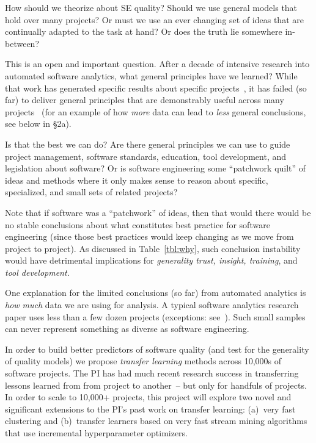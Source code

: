 


How should we theorize about SE quality?  Should we use  general models that hold over many projects? Or must we use an ever changing set of ideas that are   continually adapted to the task at hand? 
Or does the truth lie somewhere in-between?  

This is an open and important question. After a decade of intensive research into automated software analytics,
what general principles have we learned?
While that work has generated   specific results about   specific projects~\cite{Bird:2015,menzies2013software},
it has failed (so far) to deliver general principles that are demonstrably useful across many projects~\cite{menzies2013guest} (for an example of how {\em more} data can lead to {\em less} general conclusions,
see below in {\S}2a).

Is that the best we can do? 
Are there general principles we can use to guide project management, software standards, education,   tool development, and legislation about software? 
Or is  software engineering some ``patchwork quilt'' of ideas and methods where it only makes sense to reason about
specific, specialized, and small sets of related projects? 

Note that if software was a ``patchwork'' of ideas,   then that would  there would be no stable conclusions about what constitutes best practice for software
engineering (since those best practices would keep changing as we move from project to project). 
As discussed in Table~\ref{tbl:why}, such conclusion instability
would have detrimental
implications for {\em generality trust, insight, training}, and {\em tool
          development}.
          
     
One  explanation for the limited conclusions (so far) from automated analytics is  {\em how much} data we are using for analysis. 
A  typical   software analytics research paper uses less
than a few dozen projects  (exceptions: see~\cite{krishna18a, zhao17, agrawal18}). Such small samples can never represent something as diverse as software engineering.

In order to build better predictors of software quality
(and test for the generality of quality models)
we propose  {\em transfer learning}
methods across 10,000s of software projects.
The PI has had much recent research success
in transferring lessons learned from from project to another~\cite{nam2018heterogeneous,krishna2016b, krishna16a, krishna2017less, krishna2017simpler, krishna2016bigse, krishna16, krishna2017learning}-- but only for  handfuls of projects. 
In order to scale to 10,000+ projects,   this project will explore two  novel and significant extensions to
the PI's past work on transfer learning:
(a)~very fast clustering and (b)~transfer
learners based 
on  
very fast stream mining  algorithms that use
incremental hyperparameter optimizers.

